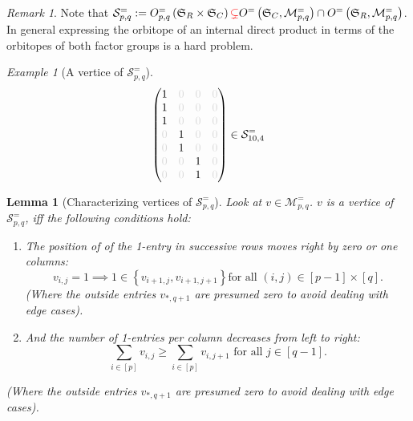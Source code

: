 \documentclass[a4paper]{amsart}
\theoremstyle{lemma}
\newtheorem{lemma}[theorem]{Lemma}
\theoremstyle{definition}
\theoremstyle{remark}
\newtheorem{remark}[theorem]{Remark}
\theoremstyle{example}
\newtheorem{example}[theorem]{Example}
\newcommand{\lr}[1]{\ensuremath{\left( #1 \right)}}
\newcommand{\lrE}[1]{\ensuremath{\left[ #1 \right]}}
\newcommand{\lrM}[1]{\ensuremath{\left\{ #1 \right\}}}
\newcommand{\M}{\ensuremath{\mathcal{M}}}
\newcommand{\calS}{\ensuremath{\mathcal{S}}}
\newcommand{\Sym}{\ensuremath{\mathfrak{S}}}
\newcommand{\SymRC}{\ensuremath{\Sym_R \times \Sym_C}}
\begin{document}
\begin{remark}
  Note that \(\calS^=_{p, q} := O^=_{p, q} \lr{\SymRC} {\color{red}\subsetneq}
  O^=\lr{\Sym_C,\M^=_{p, q}} \cap O^=\lr{\Sym_R, \M^=_{p, q}}\).  In
  general expressing the orbitope of an internal direct product in
  terms of the orbitopes of both factor groups is a hard problem.
\end{remark}

\begin{example}[A vertice of \(\calS^=_{p, q}\)]
\label{zumBild}
\[\lr{\begin{matrix}
      1 & {\color{lightgray} 0} & {\color{lightgray} 0} & {\color{lightgray} 0} \\
      1 & {\color{lightgray} 0} & {\color{lightgray} 0} & {\color{lightgray} 0} \\
      1 & {\color{lightgray} 0} & {\color{lightgray} 0} & {\color{lightgray} 0} \\
      {\color{lightgray} 0} & 1 & {\color{lightgray} 0} & {\color{lightgray} 0} \\      
      {\color{lightgray} 0} & 1 & {\color{lightgray} 0} & {\color{lightgray} 0} \\
      {\color{lightgray} 0} & {\color{lightgray} 0} & 1 & {\color{lightgray} 0} \\      
      {\color{lightgray} 0} & {\color{lightgray} 0} & 1 & {\color{lightgray} 0} \\      
    \end{matrix}
  } \in \calS^=_{10, 4}
\]
\end{example}

\begin{lemma}[Characterizing vertices of \(\calS^=_{p, q}\)]
  \label{charVert}
  Look at \(v \in \M^=_{p, q}\).  \(v\) is a vertice of \(\calS^=_{p,
    q}\), iff the following conditions hold:
  \begin{enumerate}
  \item \label{cond1} The position of of the 1-entry in
    successive rows moves right by zero or one columns:
    \begin{equation*}
      v_{i,j} = 1 \implies 1 \in \lrM{v_{i+1,j}, v_{i+1,j+1}} \text{
        for all }\lr{i,j} \in \lrE{p-1} \times \lrE{q} \text{.}
    \end{equation*}
    (Where the outside entries \(v_{*,q+1}\) are presumed zero to
    avoid dealing with edge cases).
  \item \label{cond2} And the number of 1-entries per column decreases
    from left to right:
    \begin{equation*} \sum_{i\in \lrE{p}} {v_{i, j}} \geq \sum_{i \in \lrE{p}}
      {v_{i, j+1}} \text{ for all \(j \in \lrE{q-1}\).}
    \end{equation*}
  \end{enumerate}
  (Where the outside entries \(v_{*,q+1}\) are presumed zero to avoid dealing with edge cases).
\end{lemma}
\end{document}
